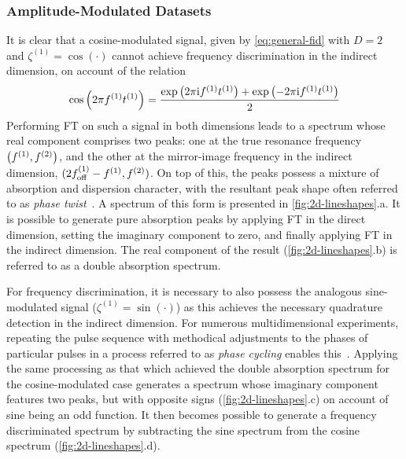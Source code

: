 \subsubsection{Amplitude-Modulated Datasets}
It is clear that a cosine-modulated signal, given by \cref{eq:general-fid}
with $D=2$ and $\zeta^{(1)} = \cos(\cdot)$ cannot achieve frequency
discrimination in the indirect dimension, on account of the relation
\begin{equation}
    \cos\left(2 \pi f^{(1)} t^{(1)}\right) =
    \frac{\exp\left(2 \pi \mathrm{i} f^{(1)} t^{(1)} \right) + \exp\left(-2 \pi \mathrm{i} f^{(1)} t^{(1)} \right)}{2}
\end{equation}
Performing \ac{FT} on such a signal in both dimensions leads to a spectrum
whose real component comprises two peaks: one at the true resonance frequency
$\left(f^{(1)}, f^{(2)}\right)$, and the other at the mirror-image frequency in the
indirect dimension, $(2f_{\mathrm{off}}^{(1)} - f^{(1)}, f^{(2)})$. On top of this, the
peaks possess a mixture of absorption and dispersion character, with the
resultant peak shape often referred to as \emph{phase twist}~\cite{Keeler1985}.
A spectrum of this form is presented in \cref{fig:2d-lineshapes}.a.
It is possible to generate pure absorption peaks by applying \ac{FT} in the
direct dimension, setting the imaginary component to zero, and finally
applying \ac{FT} in the indirect dimension. The real component of the result
(\cref{fig:2d-lineshapes}.b) is referred to as a double absorption spectrum.

For frequency discrimination, it is necessary to also possess the
analogous sine-modulated signal ($\zeta^{(1)} = \sin(\cdot)$) as this
achieves the necessary quadrature detection in the indirect dimension. For
numerous multidimensional experiments, repeating the
pulse sequence with methodical adjustments to the phases of particular pulses
in a process referred to as \emph{phase cycling} enables
this~\cite[Chapter 11]{Keeler2010}.
Applying the same processing as that which achieved the double absorption
spectrum for the cosine-modulated case generates a spectrum whose imaginary
component features two peaks, but with opposite signs
(\cref{fig:2d-lineshapes}.c) on account of sine being an odd function.
It then becomes possible to generate a frequency discriminated spectrum by
subtracting the sine spectrum from the cosine spectrum
(\cref{fig:2d-lineshapes}.d).

